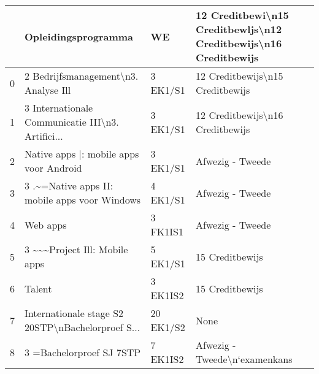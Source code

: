 \begin{tabular}{llll}
\toprule
{} &                                Opleidingsprogramma &         WE & 12 Creditbewi\textbackslash n15 Creditbewljs\textbackslash n12 Creditbewijs\textbackslash n16 Creditbewijs \\
\midrule
0 &               2 Bedrijfsmanagement\textbackslash n3. Analyse Ill &   3 EK1/S1 &                   12 Creditbewijs\textbackslash n15 Creditbewijs \\
1 &  3 Internationale Communicatie III\textbackslash n3. Artifici... &   3 EK1/S1 &                   12 Creditbewijs\textbackslash n16 Creditbewijs \\
2 &            Native apps |: mobile apps voor Android &   3 EK1/S1 &                                   Afwezig - Tweede \\
3 &      3 .\textasciitilde =Native apps II: mobile apps voor Windows &   4 EK1/S1 &                                   Afwezig - Tweede \\
4 &                                           Web apps &   3 FK1IS1 &                                   Afwezig - Tweede \\
5 &                     3 \textasciitilde \textasciitilde  \textasciitilde Project Ill: Mobile apps &   5 EK1/S1 &                                    15 Creditbewijs \\
6 &                                             Talent &   3 EK1IS2 &                                    15 Creditbewijs \\
7 &  Internationale stage S2 20STP\textbackslash nBachelorproef S... &  20 EK1/S2 &                                               None \\
8 &                          3  =Bachelorproef SJ 7STP &   7 EK1IS2 &                      Afwezig - Tweede\textbackslash n‘examenkans \\
\bottomrule
\end{tabular}
